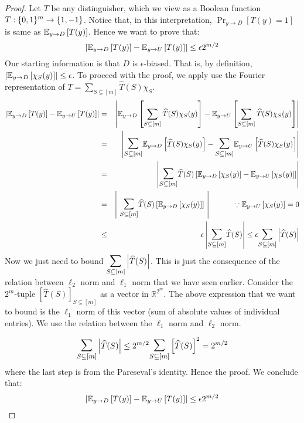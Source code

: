\begin{proof}
Let $T$ be any distinguisher, which we view as a Boolean function $T : \{0,1\}^m \to \{1,-1\}$. Notice that, in this interpretation, $\Pr_{y \to D} \left[ T(y) = 1 \right]$ is same as ${\mathbb E}_{y \to D} \left[ T(y) \right]$. Hence we want to prove that:
$$\left| {\mathbb E}_{y \to D} \left[ T(y) \right] - {\mathbb E}_{y \to U} \left[ T(y) \right] \right| \le \epsilon 2^{m/2}$$
Our starting information is that $D$ is $\epsilon$-biased. That is, by definition, $\left| {\mathbb E}_{y \to D} \left[  \chi_S(y) \right] \right|  \le \epsilon$. 
To proceed with the proof, we apply use the Fourier representation of $T  = \sum_{S \subseteq [m]} \widehat{T}(S) \chi_S$.
\begin{eqnarray*}
\left| \E_{y \to D} \left[ T(y) \right] - \E_{y \to U} \left[ T(y) \right] \right| & = & 
\left| \E_{y \to D} \left[ \sum_{S \subseteq [m]} \widehat{T}(S) \chi_S(y) \right] - \E_{y \to U} \left[ \sum_{S \subseteq [m]} \widehat{T}(S) \chi_S(y) \right] \right| \\
& = & 
\left| \bigsum_{S \subseteq [m]}  \E_{y \to D} \left[ \widehat{T}(S) \chi_S(y) \right] - \bigsum_{S \subseteq [m]} \E_{y \to U} \left[ \widehat{T}(S) \chi_S(y) \right] \right| \\
& = & 
\left| \bigsum_{S \subseteq [m]} \widehat{T}(S) \left[ \E_{y \to D} \left[  \chi_S(y) \right] - \E_{y \to U} \left[ \chi_S(y) \right] \right] \right| \\
& = & 
\left| ~\bigsum_{S \subseteq [m]} \widehat{T}(S) \left[ \E_{y \to D} \left[  \chi_S(y) \right] \right] ~\right| \textrm{\hspace{1cm} $\because \E_{y \to U} \left[ \chi_S(y) \right]  = 0$} \\
& \le & 
\epsilon \left| \bigsum_{S \subseteq [m]} \widehat{T}(S) \right|
\le \epsilon \bigsum_{S \subseteq [m]} \left| \widehat{T}(S) \right| \\
\end{eqnarray*}
Now we just need to bound $\bigsum_{S \subseteq [m]} \left|\widehat{T}(S)\right|$. This is just the consequence of the relation between $\ell_2$ norm and $\ell_1$ norm that we have seen earlier. Consider the $2^m$-tuple $\left[ \widehat{T}(S) \right]_{S \subseteq [m]}$ as a vector in $\mathbb{R}^{2^m}$. The above expression that we want to bound is the $\ell_1$ norm of this vector (sum of absolute values of individual entries). We use the relation between the $\ell_1$ norm and $\ell_2$ norm.

$$\bigsum_{S \subseteq [m]} \left|\widehat{T}(S)\right| \le 2^{m/2} \bigsum_{S \subseteq [m]} \left[ \widehat{T}(S)\right]^2 = 2^{m/2}$$
where the last step is from the Pareseval's identity. Hence the proof. We conclude that:
$$\left| {\mathbb E}_{y \to D} \left[ T(y) \right] - {\mathbb E}_{y \to U} \left[ T(y) \right] \right| \le \epsilon 2^{m/2}$$
\end{proof}

